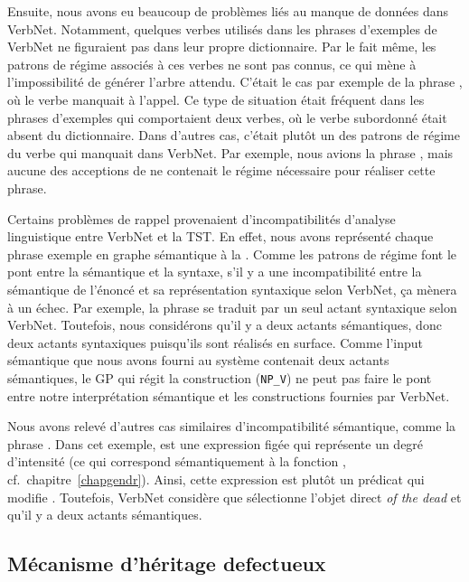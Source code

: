 Ensuite, nous avons eu beaucoup de problèmes liés au manque de données dans VerbNet. Notamment, quelques verbes utilisés dans les phrases d'exemples de VerbNet ne figuraient pas dans leur propre dictionnaire. Par le fait même, les patrons de régime associés à ces verbes ne sont pas connus, ce qui mène à l'impossibilité de générer l'arbre attendu. C'était le cas par exemple de la phrase , où le verbe  manquait à l'appel. Ce type de situation était fréquent dans les phrases d'exemples qui comportaient deux verbes, où le verbe subordonné était absent du dictionnaire. Dans d'autres cas, c'était plutôt un des patrons de régime du verbe qui manquait dans VerbNet. Par exemple, nous avions la phrase , mais aucune des acceptions de  ne contenait le régime nécessaire pour réaliser cette phrase.

Certains problèmes de rappel provenaient d'incompatibilités d'analyse linguistique entre VerbNet et la \ac{TST}. En effet, nous avons représenté chaque phrase exemple en graphe sémantique à la \cite{mel2012semantics}. Comme les patrons de régime font le pont entre la sémantique et la syntaxe, s'il y a une incompatibilité entre la sémantique de l'énoncé et sa représentation syntaxique selon VerbNet, ça mènera à un échec. Par exemple, la phrase  se traduit par un seul actant syntaxique selon VerbNet. Toutefois, nous considérons qu'il y a deux actants sémantiques, donc deux actants syntaxiques puisqu'ils sont réalisés en surface. Comme l'input sémantique que nous avons fourni au système contenait deux actants sémantiques, le \ac{GP} qui régit la construction (\texttt{NP\_V}) ne peut pas faire le pont entre notre interprétation sémantique et les constructions fournies par VerbNet. 

Nous avons relevé d'autres cas similaires d'incompatibilité sémantique, comme la phrase . Dans cet exemple,  est une expression figée qui représente un degré d'intensité (ce qui correspond sémantiquement à la fonction , cf.~chapitre~\ref{chapgendr}). Ainsi, cette expression est plutôt un prédicat qui modifie . Toutefois, VerbNet considère que  sélectionne l'objet direct \emph{of the dead} et qu'il y a deux actants sémantiques.

\subsection{Mécanisme d'héritage defectueux} 

